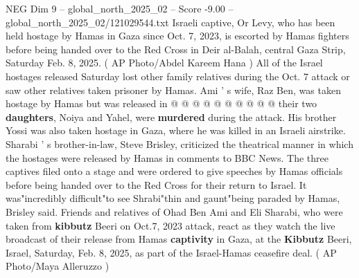 \begin{textsample}{NEG Dim 9 – global\_north\_2025\_02 – Score -9.00 – global\_north\_2025\_02/121029544.txt}
Israeli captive, Or Levy, who has been held hostage by Hamas in Gaza since Oct. 7, 2023, is escorted by Hamas fighters before being handed over to the Red Cross in Deir al-Balah, central Gaza Strip, Saturday Feb. 8, 2025. ( AP Photo/Abdel Kareem Hana ) All of the Israel hostages released Saturday lost other family relatives during the Oct. 7 attack or saw other relatives taken prisoner by Hamas.
Ami ' s wife, Raz Ben, was taken hostage by Hamas but was released in @ @ @ @ @ @ @ @ @ @ their two \textbf{daughters}, Noiya and Yahel, were \textbf{murdered} during the attack.
His brother Yossi was also taken hostage in Gaza, where he was killed in an Israeli airstrike.
Sharabi ' s brother-in-law, Steve Brisley, criticized the theatrical manner in which the hostages were released by Hamas in comments to BBC News.
The three captives filed onto a stage and were ordered to give speeches by Hamas officials before being handed over to the Red Cross for their return to Israel.
It was"incredibly difficult"to see Shrabi"thin and gaunt"being paraded by Hamas, Brisley said.
Friends and relatives of Ohad Ben Ami and Eli Sharabi, who were taken from \textbf{kibbutz} Beeri on Oct.7, 2023 attack, react as they watch the live broadcast of their release from Hamas \textbf{captivity} in Gaza, at the \textbf{Kibbutz} Beeri, Israel, Saturday, Feb. 8, 2025, as part of the Israel-Hamas ceasefire deal. ( AP Photo/Maya Alleruzzo )

\end{textsample}
